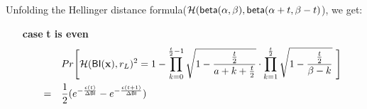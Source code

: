 \documentclass{article}
\begin{document}
Unfolding the Hellinger distance formula($\mathcal{H}(\mathsf{beta}(\alpha, \beta), \mathsf{beta}(\alpha + t, \beta - t)$), we get:
\begin{itemize}
  \item[\textbf{case}] \textbf{t is even}\\
  \begin{align*}
  & Pr\Bigg[\mathcal{H}(\mathsf{BI}(\textbf{x}), r_L )^2 
  = 1 - \prod_{k = 0}^{\frac{t}{2} - 1}
  \sqrt{1 - \frac{\frac{t}{2}}{a + k + \frac{t}{2}}}
  \cdot
  \prod_{k = 1}^{\frac{t}{2}}
  \sqrt{1 - \frac{\frac{t}{2}}{\beta - k}}\ \Bigg] \\
  = \quad & \frac{1}{2} (e^{- \frac{\epsilon (t)}{\Delta \mathsf{BI}}} - e^{- \frac{\epsilon (t + 1)}{\Delta \mathsf{BI}}})\\
  \end{align*}



  

\end{itemize}
\end{document}
